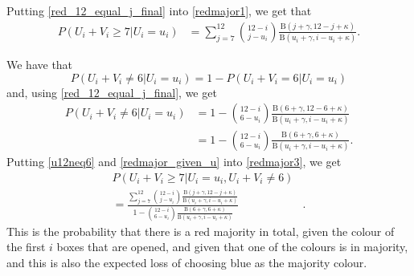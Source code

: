 Putting \eqref{red_12_equal_j_final} into \eqref{redmajor1}, we get that
\begin{equation}
\label{redmajor_given_u}
    \begin{aligned}
        P(U_i+V_i \geq 7 | U_i=u_i) 
        &= \sum_{j=7}^{12} \binom{12-i}{j-u_i} \frac{\text{B}(j+\gamma,12-j+\kappa)}{\text{B}(u_i+\gamma,i-u_i+\kappa)}.
    \end{aligned}
\end{equation}

We have that
\begin{equation*}
    P(U_i+V_i\neq6|U_i=u_i) 
        = 1-P(U_i+V_i=6|U_i=u_i)
\end{equation*}
and, using \eqref{red_12_equal_j_final}, we get 
\begin{equation}
\label{u12neq6}
    \begin{aligned}
        P(U_i+V_i\neq6|U_i=u_i) 
        &= 1-\binom{12-i}{6-u_i} \frac{\text{B}(6+\gamma,12-6+\kappa)}{\text{B}(u_i+\gamma,i-u_i+\kappa)}\\[6pt]
        &= 1-\binom{12-i}{6-u_i} \frac{\text{B}(6+\gamma,6+\kappa)}{\text{B}(u_i+\gamma,i-u_i+\kappa)}.
    \end{aligned}
\end{equation}
Putting \eqref{u12neq6} and \eqref{redmajor_given_u} into \eqref{redmajor3}, we get
\begin{equation}
\label{redmajor_final}
    \begin{aligned}
        P(U_i+V_i \geq 7 | U_i=u_i,U_i+V_i \neq 6)& \\[6pt]
        = \frac{\sum_{j=7}^{12} \binom{12-i}{j-u_i} \frac{\text{B}(j+\gamma,12-j+\kappa)}{\text{B}(u_i+\gamma,i-u_i+\kappa)}}{1-\binom{12-i}{6-u_i} \frac{\text{B}(6+\gamma,6+\kappa)}{\text{B}(u_i+\gamma,i-u_i+\kappa)}}&.
    \end{aligned}
\end{equation}
This is the probability that there is a red majority in total, given the colour of the first $i$ boxes that are opened, and given that one of the colours is in majority, and this is also the expected loss of choosing blue as the majority colour. 


